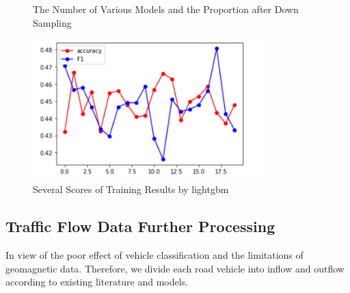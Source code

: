 \documentclass[fontset=none]{ctexart}
\theoremstyle{definition}
\theoremstyle{remark}
\begin{document}
\begin{figure}[h]
  \centering
  \quad
  \caption{The Number of Various Models and the Proportion after Down Sampling}
\end{figure}

\begin{figure}[htb]
  \centering
  \includegraphics[width=0.8\textwidth]{images/8-3-4.png}
  \caption{Several Scores of Training Results by lightgbm}
  \label{fig: 834}
\end{figure}

\clearpage
\subsection{Traffic Flow Data Further Processing}
In view of the poor effect of vehicle classification and the limitations of geomagnetic data. Therefore, we divide each road vehicle into inflow and outflow according to existing literature and models.
\end{document}
